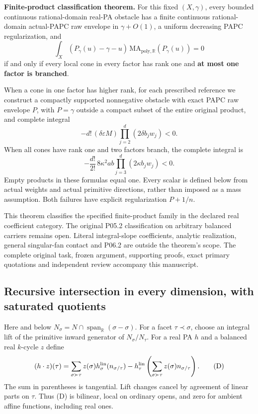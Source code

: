 \documentclass[
  11pt,
]{article}
\begin{document}
\textbf{Finite-product classification theorem.} For this
fixed \((X,\gamma)\), every bounded continuous rational-domain real-PA
obstacle has a finite continuous rational-domain actual-PAPC raw
envelope in \(\gamma+O(1)\), a uniform decreasing PAPC regularization,
and \[
       \int_X(P_\gamma(u)-\gamma-u)\,
                  \mathrm{MA}_{\mathrm{poly},\mathbb{R}}(P_\gamma(u))=0
 \tag{C}
\] if and only if every local cone in every factor has rank one and
\textbf{at most one factor is branched}.

When a cone in one factor has higher rank, for each prescribed reference
we construct a compactly supported nonnegative obstacle with exact PAPC
raw envelope \(P\), with \(P=\gamma\) outside a compact subset of the
entire original product, and complete integral \[
 -d!\,(\delta\varepsilon M)\prod_{j=2}^d(2\delta b_jw_j)<0.
 \tag{H}
\] When all cones have rank one and two factors branch, the complete
integral is \[
 -\frac{d!}{2!}\,8\kappa^2ab\prod_{j=3}^d(2\kappa b_jw_j)<0.
 \tag{T}
\] Empty products in these formulas equal one. Every scalar is defined
below from actual weights and actual primitive directions, rather than
imposed as a mass assumption. Both failures have explicit regularization
\(P+1/n\).

This theorem classifies the specified finite-product family in the
declared real coefficient category. The original P05.2 classification
on arbitrary balanced carriers remains open. Literal integral-slope
coefficients, analytic realization, general singular-fan contact and
P06.2 are outside the theorem's scope. The complete original task,
frozen argument, supporting proofs, exact primary quotations and
independent review accompany this manuscript.

\subsection{Recursive intersection in every dimension, with saturated
quotients}\label{recursive-intersection-in-every-dimension-with-saturated-quotients}

Here and below
\(N_\sigma=N\cap\operatorname{span}_{\mathbb{R}}(\sigma-\sigma)\). For a
facet \(\tau\prec\sigma\), choose an integral lift of the primitive
inward generator of \(N_\sigma/N_\tau\). For a real PA \(h\) and a
balanced real \(k\)-cycle \(z\) define \[
 (h\cdot z)(\tau)=\sum_{\sigma\succ\tau}z(\sigma)h_\sigma^{\rm lin}(n_{\sigma/\tau})
       -h_\tau^{\rm lin}\left(\sum_{\sigma\succ\tau}z(\sigma)n_{\sigma/\tau}\right).
 \tag{D}
\] The sum in parentheses is tangential. Lift changes cancel by
agreement of linear parts on \(\tau\). Thus (D) is bilinear, local on
ordinary opens, and zero for ambient affine functions, including real
ones.
\end{document}
